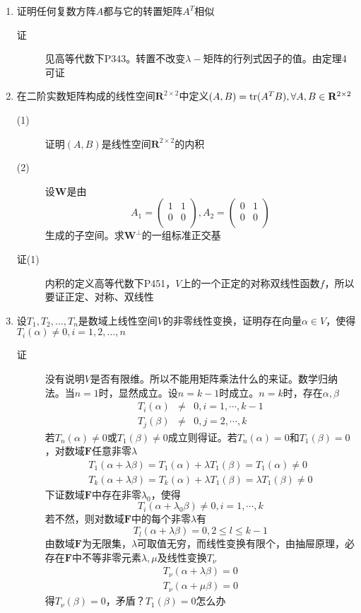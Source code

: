 \begin{enumerate}
\item 证明任何复数方阵$A$都与它的转置矩阵$A^T$相似
\begin{description}
\item[证] 见高等代数下P343。转置不改变$\lambda-$矩阵的行列式因子的值。由定理4可证
\end{description}

\item 在二阶实数矩阵构成的线性空间$\mathbf{R}^{2\times2}$中定义$(A,B)=\operatorname{tr}(A^TB),\forall A,B\in \mathbf{R}^{2\times2}$
\begin{description}
\item[(1)] 证明$(A,B)$是线性空间$\mathbf{R}^{2\times2}$的内积
\item[(2)] 设$\mathbf{W}$是由
\[
A_1=\left(
\begin{array}{cc}
1 & 1\\
0 & 0\\
\end{array}\right),
A_2=\left(
\begin{array}{cc}
0 & 1\\
0 & 0\\
\end{array}\right)
\]
生成的子空间。求$\mathbf{W}^\perp$的一组标准正交基
\item[证(1)] 内积的定义高等代数下P451，$V$上的一个正定的对称双线性函数$f$，所以要证正定、对称、双线性
\end{description}

\item 设$T_1,T_2,\dots,T_n$是数域上线性空间$V$的非零线性变换，证明存在向量$\alpha \in V$，使得$T_i(\alpha) \neq 0,i=1,2,\dots,n$
\begin{description}
\item[证] 没有说明$V$是否有限维。所以不能用矩阵乘法什么的来证。数学归纳法。当$n=1$时，显然成立。设$n=k-1$时成立。$n=k$时，存在$\alpha,\beta$
\begin{eqnarray*}
T_i(\alpha) & \neq & 0, i=1,\cdots,k-1 \\
T_j(\beta)  & \neq & 0, j=2,\cdots,k
\end{eqnarray*}
若$T_n(\alpha) \neq 0$或$T_1(\beta) \neq 0$成立则得证。若$T_n(\alpha)= 0$和$T_1(\beta) = 0$，对数域$\mathbf{F}$任意非零$\lambda$
\begin{eqnarray*}
T_1(\alpha+ \lambda\beta) = T_1(\alpha) + \lambda T_1(\beta) = T_1(\alpha) \neq 0 \\
T_k(\alpha+ \lambda\beta) = T_k(\alpha) + \lambda T_1(\beta) = \lambda T_1(\beta) \neq 0
\end{eqnarray*}
下证数域$\mathbf{F}$中存在非零$\lambda_0$，使得
\[
T_i(\alpha+ \lambda_0 \beta) \neq 0,i=1,\cdots,k
\]
若不然，则对数域$\mathbf{F}$中的每个非零$\lambda$有
\[
T_l(\alpha+ \lambda\beta)=0, 2\leq l \leq k-1
\]
由数域$\mathbf{F}$为无限集，$\lambda$可取值无穷，而线性变换有限个，由抽屉原理，必存在$\mathbf{F}$中不等非零元素$\lambda,\mu$及线性变换$T_{\nu}$
\begin{eqnarray*}
T_{\nu}(\alpha+ \lambda\beta)=0\\
T_{\nu}(\alpha+ \mu\beta)=0
\end{eqnarray*}
得$T_{\nu}(\beta)=0$，矛盾？$T_1(\beta)=0$怎么办


\end{description}
\end{enumerate}
